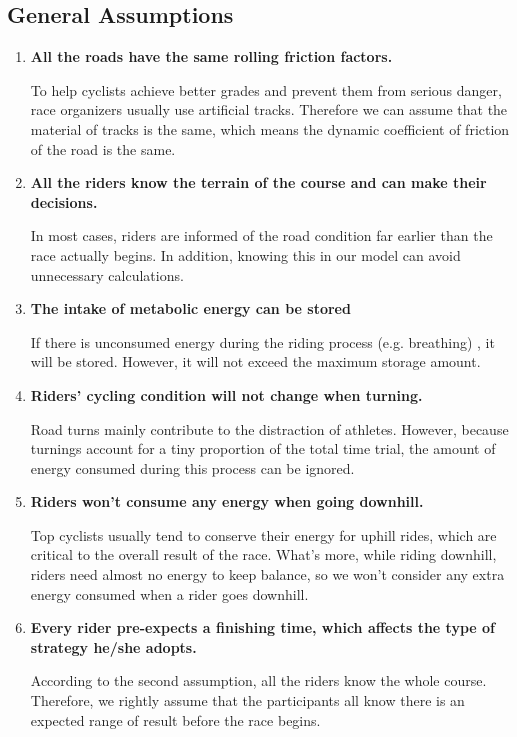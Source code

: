 \documentclass[12pt]{article}
\theoremstyle{definition}
\theoremstyle{remark}
\numberwithin{equation}{section}
\begin{document}
	\subsection{General Assumptions}
	\begin{enumerate}
		\item  \textbf{All the roads have the same rolling friction factors.}

				To help cyclists achieve better grades and prevent them from serious danger, race organizers usually use artificial tracks. Therefore we can assume that the material of tracks is the same, which means the dynamic coefficient of friction of the road is the same.
		\item  \textbf{All the riders know the terrain of the course and can make their decisions.}
		
				In most cases, riders are informed of the road condition far earlier than the race actually begins. In addition, knowing this in our model can avoid unnecessary calculations.
		\item  \textbf{The intake of metabolic energy can be stored}
		
				If there is unconsumed energy during the riding process (e.g. breathing) , it will be stored. However, it will not exceed the maximum storage amount.
		\item  \textbf{Riders' cycling condition will not change when turning.}
		
				Road turns mainly contribute to the distraction of athletes. However, because turnings account for a tiny proportion of the total time trial, the amount of energy consumed during this process can be ignored.
		\item \textbf{Riders won't consume any energy when going downhill.}
		
				Top cyclists usually tend to conserve their energy for uphill rides, which are critical to the overall result of the race. What's more, while riding downhill, riders need almost no energy to keep balance, so we won't consider any extra energy consumed when a rider goes downhill.
		\item \textbf{Every rider pre-expects a finishing time, which affects the type of strategy he/she adopts.}
			
				According to the second assumption, all the riders know the whole course. Therefore, we rightly assume that the participants all know there is an expected range of result before the race begins.	
	\end{enumerate}
	
\end{document}
